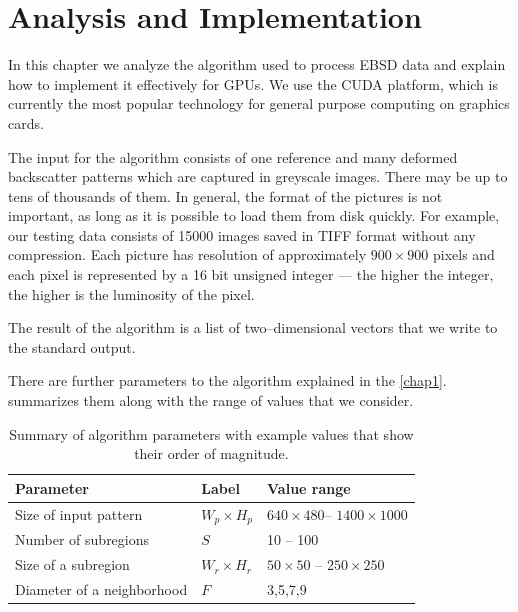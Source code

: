 \chapter{Analysis and Implementation}

In this chapter we analyze the algorithm used to process EBSD data and explain how to implement it effectively for GPUs. We use the CUDA platform, which is currently the most popular technology for general purpose computing on graphics cards.


The input for the algorithm consists of one reference and many deformed backscatter patterns which are captured in greyscale images. There may be up to tens of thousands of them. In general, the format of the pictures is not important, as long as it is possible to load them from disk quickly. For example, our testing data consists of 15000 images saved in TIFF format without any compression. Each picture has resolution of approximately $900 \times 900$ pixels and each pixel is represented by a 16 bit unsigned integer --- the higher the integer, the higher is the luminosity of the pixel.

The result of the algorithm is a list of two--dimensional vectors that we write to the standard output.

There are further parameters to the algorithm explained in the \cref{chap1}.  summarizes them along with the range of values that we consider.

\begin{table}[]
	\centering
	\begin{tabular}{@{}lll@{}}
		\toprule
		Parameter                  & Label            &    Value range  \\ \midrule
		Size of input pattern      & $W_p \times H_p$ & $640 \times 480$\footnotemark  -- $1400 \times 1000$ \footnotemark  \\
		Number of subregions       & $S$              &               10 -- 100 \\
		Size of a subregion        & $W_r \times H_r$ & $50 \times 50$ -- $250 \times 250$ \\
		Diameter of a neighborhood & $F$              &                3,5,7,9 \\ \bottomrule
	\end{tabular}
	\caption{Summary of algorithm parameters with example values that show their order of magnitude.}
	\label{params}
\end{table}

